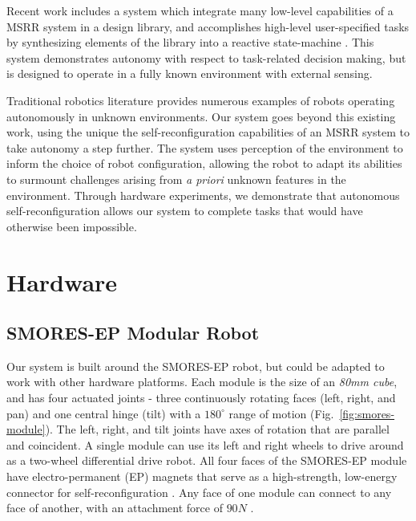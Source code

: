 \documentclass[conference]{IEEEtran}
\begin{document}

Recent work includes a system which integrate many low-level capabilities of a MSRR system in a design library, and accomplishes high-level user-specified tasks by synthesizing elements of the library into a reactive state-machine \cite{Jing2016}. This system demonstrates autonomy with respect to task-related decision making, but is designed to operate in a fully known environment with external sensing.

Traditional robotics literature provides numerous examples of robots operating autonomously in unknown environments. Our system goes beyond this existing work, using the unique the self-reconfiguration capabilities of an MSRR system to take autonomy a step further.  The system uses perception of the environment  to inform the choice of robot configuration, allowing the robot to adapt its abilities to surmount challenges arising from \textit{a priori} unknown features in the environment. Through hardware experiments, we demonstrate that autonomous self-reconfiguration allows our system to complete tasks that would have otherwise been impossible.

\section{Hardware} %
\label{sec:hardware}
%
\subsection{SMORES-EP Modular Robot} \label{sec:smores}
%
Our system is built around the SMORES-EP robot, but could be adapted to
work with other hardware platforms. Each module is the size of an \textit{80mm cube}, and has four actuated joints - three continuously rotating faces (left, right, and
pan)  and one central hinge (tilt) with a \(180^\circ\) range of motion
(Fig.~\ref{fig:smores-module}). The left, right, and tilt joints have
 axes of rotation that are parallel and coincident. A single module can use its
left and right wheels to drive around as a two-wheel differential drive robot.
All four faces of the SMORES-EP module have electro-permanent (EP) magnets
that serve as a high-strength, low-energy connector for self-reconfiguration
\cite{tosun2016design}.  Any face of one module can connect to any face of
another, with an attachment force of $90N$ \cite{tosun2016design}. 
\end{document}
